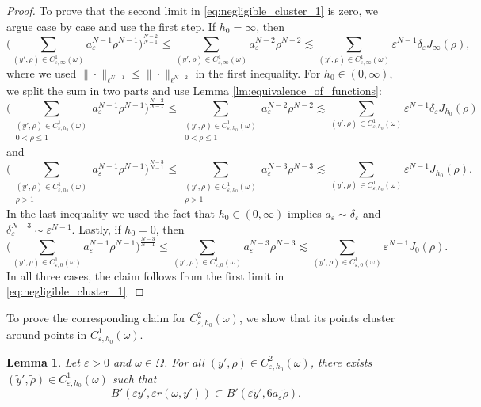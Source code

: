 \documentclass{article}
\numberwithin{equation}{section}
\newtheorem{lemma}[theorem]{Lemma}
\theoremstyle{definition}
\theoremstyle{remark}
\begin{document}
\begin{proof}
    To prove that the second limit in \eqref{eq:negligible_cluster_1} is zero, we argue case by case and use the first step. If $h_0 = \infty$, then
    \[
    \Bigg(\sum_{(y', \rho) \in C_{\varepsilon, \infty}^1(\omega)} a_\varepsilon^{N - 1} \rho^{N - 1}\Bigg)^\frac{N - 2}{N - 1} \le \sum_{(y', \rho) \in C_{\varepsilon, \infty}^1(\omega)} a_\varepsilon^{N - 2} \rho^{N - 2} \lesssim \sum_{(y', \rho) \in C_{\varepsilon, \infty}^1(\omega)} \varepsilon^{N - 1} \delta_\varepsilon J_\infty(\rho),
    \]
    where we used $\|\cdot\|_{\ell^{N - 1}} \le \|\cdot\|_{\ell^{N - 2}}$ in the first inequality. For $h_0 \in (0, \infty)$, we split the sum in two parts and use Lemma \ref{lm:equivalence_of_functions}:
    \[
    \Bigg(\sum \limits_{\substack{(y', \rho) \in C_{\varepsilon, h_0}^1(\omega) \\ 0 < \rho \le 1}} a_\varepsilon^{N - 1} \rho^{N - 1}\Bigg)^\frac{N - 2}{N - 1} \le \sum \limits_{\substack{(y', \rho) \in C_{\varepsilon, h_0}^1(\omega) \\ 0 < \rho \le 1}} a_\varepsilon^{N - 2} \rho^{N - 2} \lesssim \sum_{(y', \rho) \in C_{\varepsilon, h_0}^1(\omega)} \varepsilon^{N - 1} \delta_\varepsilon J_{h_0}(\rho)
    \]
    and
    \[
    \Bigg(\sum \limits_{\substack{(y', \rho) \in C_{\varepsilon, h_0}^1(\omega) \\ \rho > 1}} a_\varepsilon^{N - 1} \rho^{N - 1}\Bigg)^\frac{N - 3}{N - 1} \le \sum \limits_{\substack{(y', \rho) \in C_{\varepsilon, h_0}^1(\omega) \\ \rho > 1}} a_\varepsilon^{N - 3} \rho^{N - 3} \lesssim \sum_{(y', \rho) \in C_{\varepsilon, h_0}^1(\omega)} \varepsilon^{N - 1} J_{h_0}(\rho).
    \]
    In the last inequality we used the fact that $h_0 \in (0, \infty)$ implies $a_\varepsilon \sim \delta_\varepsilon$ and $\delta_\varepsilon^{N - 3} \sim \varepsilon^{N - 1}$. Lastly, if $h_0 = 0$, then
    \[
    \Bigg(\sum_{(y', \rho) \in C_{\varepsilon, 0}^1(\omega)} a_\varepsilon^{N - 1} \rho^{N - 1}\Bigg)^\frac{N - 3}{N - 1} \le \sum_{(y', \rho) \in C_{\varepsilon, 0}^1(\omega)} a_\varepsilon^{N - 3} \rho^{N - 3} \lesssim \sum_{(y', \rho) \in C_{\varepsilon, 0}^1(\omega)} \varepsilon^{N - 1} J_0(\rho).
    \]
    In all three cases, the claim follows from the first limit in \eqref{eq:negligible_cluster_1}.
\end{proof}

To prove the corresponding claim for $C_{\varepsilon, h_0}^2(\omega)$, we show that its points cluster around points in $C_{\varepsilon, h_0}^1(\omega)$.

\begin{lemma} \label{lm:cluster_within_cluster}
    Let $\varepsilon > 0$ and $\omega \in \Omega$. For all $(y', \rho) \in C_{\varepsilon, h_0}^2(\omega)$, there exists $(\tilde{y}', \tilde{\rho}) \in C_{\varepsilon, h_0}^1(\omega)$ such that
    \begin{equation} \label{eq:absorbed_by_cluster_point}
        B'(\varepsilon y', \varepsilon r(\omega, y')) \subset B'\left(\varepsilon \tilde{y}', 6 a_\varepsilon \tilde{\rho}\right).
    \end{equation}
\end{lemma}
\end{document}
